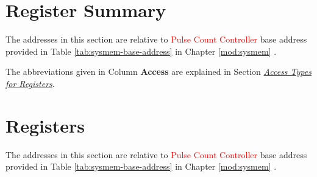 \documentclass[main\_\_EN.tex]{subfiles}
\begin{document}



\clearpage
\hypertarget{pcnt-reg-summ}{}
\section{Register Summary}
\label{sec:pcnt-reg-summ}

The addresses in this section are relative to \textcolor{red}{Pulse Count Controller} base address provided in Table \ref{tab:sysmem-base-address} in Chapter \ref{mod:sysmem} \textit{}.

The abbreviations given in Column \textbf{Access} are explained in Section \hyperref[glossary-access-types]{\textit{Access Types for Registers}}.






\clearpage
\section{Registers}

The addresses in this section are relative to \textcolor{red}{Pulse Count Controller} base address provided in Table \ref{tab:sysmem-base-address} in Chapter \ref{mod:sysmem} \textit{}.


\end{document}
